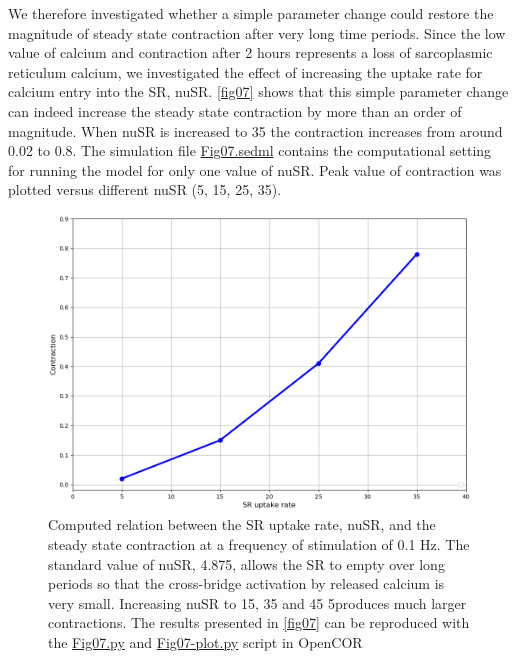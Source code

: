\documentclass[fleqn,10pt]{physiome}
\begin{document}
We therefore investigated whether a simple parameter change could restore the magnitude of steady state contraction after very long time periods. Since the low value of calcium and contraction after 2 hours represents a loss of sarcoplasmic reticulum calcium, we investigated the effect of increasing the uptake rate for calcium entry into the SR, nuSR. \autoref{fig07} shows that this simple parameter change can indeed increase the steady state contraction by more than an order of magnitude. When nuSR is increased to 35 the contraction increases from around 0.02 to 0.8. The simulation file \href{https://models.physiomeproject.org/workspace/5c6/file/afd4d5cb20ecdcbc0b10198fe31795520488a34e/Fig07.sedml}{Fig07.sedml} contains the computational setting for running the model for only one value of nuSR. Peak value of contraction was plotted versus different nuSR (5, 15, 25, 35).\newline

\begin{figure}[h!]
\centering
\includegraphics[width=0.8\linewidth]{fig07}
\caption{Computed relation between the SR uptake rate, nuSR, and the steady state contraction at a frequency of stimulation of 0.1 Hz. The standard value of nuSR, 4.875, allows the SR to empty over long periods so that the cross-bridge activation by released calcium is very small. Increasing nuSR to 15, 35 and 45 5produces much larger contractions. The results presented in \autoref{fig07} can be reproduced with the \href{https://models.physiomeproject.org/workspace/5c6/file/afd4d5cb20ecdcbc0b10198fe31795520488a34e/Fig07.py}{Fig07.py} and \href{https://models.physiomeproject.org/workspace/5c6/file/afd4d5cb20ecdcbc0b10198fe31795520488a34e/Fig07-plot.py}{Fig07-plot.py} script in OpenCOR} 
\label{fig07}
\end{figure}
\end{document}
